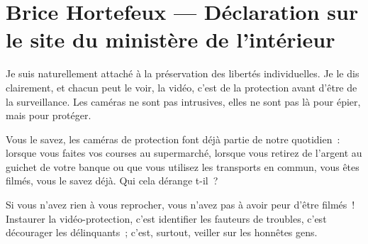 \section{Brice Hortefeux --- Déclaration sur le site du ministère de l'intérieur}

\bigskip

Je suis naturellement attaché à la préservation des libertés individuelles. Je le dis clairement, et chacun peut le voir, la vidéo, c'est de la protection avant d'être de la surveillance. Les caméras ne sont pas intrusives, elles ne sont pas là pour épier, mais pour protéger.

Vous le savez, les caméras de protection font déjà partie de notre quotidien : lorsque vous faites vos courses au supermarché, lorsque vous retirez de l'argent au guichet de votre banque ou que vous utilisez les transports en commun, vous êtes filmés, vous le savez déjà. Qui cela dérange t-il ?

Si vous n'avez rien à vous reprocher, vous n'avez pas à avoir peur d'être filmés ! Instaurer la vidéo-protection, c'est identifier les fauteurs de troubles, c'est décourager les délinquants ; c'est, surtout, veiller sur les honnêtes gens. 
